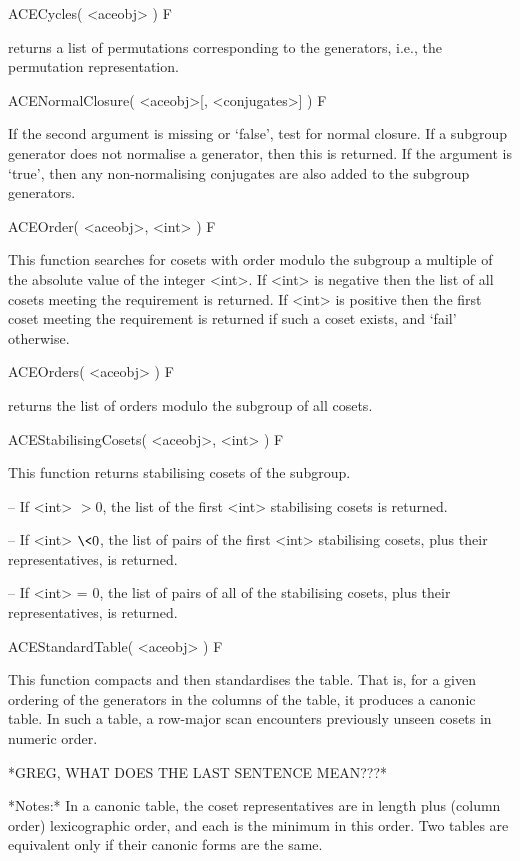 \beginitems

\>ACECycles( <aceobj> ) F

returns a list of permutations corresponding to the generators,
i.e., the permutation representation.

\>ACENormalClosure( <aceobj>[, <conjugates>] ) F

If the second argument is missing or `false', test for normal closure.
If a subgroup  generator  does not  normalise  a  generator,  then this  is
returned.
If  the  argument  is `true',  then  any  non-normalising
conjugates are also added to the subgroup generators.

\>ACEOrder( <aceobj>, <int> ) F

This function searches for cosets with order modulo the subgroup a multiple
of the absolute value of the integer <int>.
If <int> is negative then the list of all cosets meeting the requirement is
returned.
If <int> is positive then the first coset meeting the requirement is
returned if such a coset exists, and `fail' otherwise.

\>ACEOrders( <aceobj> ) F

returns the list of orders modulo the subgroup of all cosets.


\>ACEStabilisingCosets( <aceobj>, <int> ) F

This function returns stabilising cosets of the subgroup.

\beginlist
\item{--} If <int> $> 0$, the list of the first <int> stabilising cosets
    is returned.
\item{--} If <int> $\< 0$, the list of pairs of the first <int> stabilising
    cosets, plus their representatives, is returned.
\item{--} If <int> = $0$, the list of pairs of all of the stabilising cosets,
    plus their representatives, is returned.
\endlist


\>ACEStandardTable( <aceobj> ) F

This function compacts and then standardises the table.
That is, for a given ordering of the generators in the columns of the
table, it produces a canonic table.
In such a table, a row-major scan encounters previously unseen cosets in
numeric order.

*GREG, WHAT DOES THE LAST SENTENCE MEAN???*

*Notes:*
In a canonic table, the coset representatives are in length plus (column
order) lexicographic order, and each is the minimum in this order.
Two tables are equivalent only if their canonic forms are the same.

